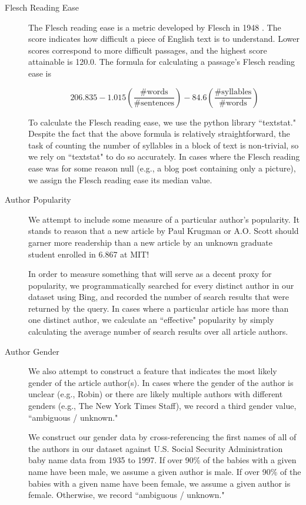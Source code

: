 \documentclass[fleqn,12pt]{SelfArx} %
\begin{document}
\begin{description}
	\item[Flesch Reading Ease] The Flesch reading ease is a metric developed by Flesch in 1948 \cite{flesch1948new}. The score indicates how difficult a piece of English text is to understand. Lower scores correspond to more difficult passages, and the highest score attainable is 120.0. The formula for calculating a passage's Flesch reading ease is
	
	\begin{equation}
	206.835 - 1.015 \left ( \frac{\textrm{\# words}}{\textrm{\# sentences}} \right ) - 84.6 \left ( \frac{\textrm{\# syllables}}{\textrm{\# words}} \right )
	\end{equation}
	
	To calculate the Flesch reading ease, we use the python library ``textstat." Despite the fact that the above formula is relatively straightforward, the task of counting the number of syllables in a block of text is non-trivial, so we rely on ``textstat" to do so accurately. In cases where the Flesch reading ease was for some reason null (e.g., a blog post containing only a picture), we assign the Flesch reading ease its median value.
	
	\item[Author Popularity] We attempt to include some measure of a particular author's popularity. It stands to reason that a new article by Paul Krugman or A.O. Scott should garner more readership than a new article by an unknown graduate student enrolled in 6.867 at MIT! 
	
	In order to measure something that will serve as a decent proxy for popularity, we programmatically searched for every distinct author in our dataset using Bing, and recorded the number of search results that were returned by the query. In cases where a particular article has more than one distinct author, we calculate an ``effective" popularity by simply calculating the average number of search results over all article authors.
	
	\item[Author Gender] We also attempt to construct a feature that indicates the most likely gender of the article author(s). In cases where the gender of the author is unclear (e.g., Robin) or there are likely multiple authors with different genders (e.g., The New York Times Staff), we record a third gender value, ``ambiguous / unknown." 
	
	We construct our gender data by cross-referencing the first names of all of the authors in our dataset against U.S. Social Security Administration baby name data from 1935 to 1997. If over 90\% of the babies with a given name have been male, we assume a given author is male. If over 90\% of the babies with a given name have been female, we assume a given author is female. Otherwise, we record ``ambiguous / unknown."
	

\end{description}
\end{document}
